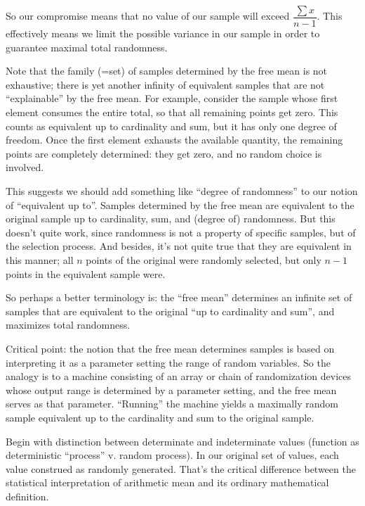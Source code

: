 \begin{ednote}
  So our compromise means that no value of our sample will exceed
  \(\dfrac{\sum x}{n-1}\).  This effectively means we limit the
  possible variance in our sample in order to guarantee maximal
  total randomness.

  Note that the family (=set) of samples determined by the free mean
  is not exhaustive; there is yet another infinity of equivalent
  samples that are not ``explainable'' by the free mean.  For example,
  consider the sample whose first element consumes the entire total,
  so that all remaining points get zero.  This counts as equivalent up
  to cardinality and sum, but it has only one degree of freedom.
  Once the first element exhausts the available quantity, the
  remaining points are completely determined: they get zero, and no
  random choice is involved.

  This suggests we should add something like ``degree of randomness''
  to our notion of ``equivalent up to''.  Samples determined by the
  free mean are equivalent to the original sample up to cardinality,
  sum, and (degree of) randomness.  But this doesn't quite work,
  since randomness is not a property of specific samples, but of the
  selection process.  And besides, it's not quite true that they are
  equivalent in this manner; all \(n\) points of the original were
  randomly selected, but only \(n-1\) points in the equivalent sample
  were.

  So perhaps a better terminology is: the ``free mean'' determines an
  infinite set of samples that are equivalent to the original ``up to
  cardinality and sum'', and maximizes total randomness.

  Critical point: the notion that the free mean determines samples is
  based on interpreting it as a parameter setting the range of random
  variables.  So the analogy is to a machine consisting of an array or
  chain of randomization devices whose output range is determined by a
  parameter setting, and the free mean serves as that parameter.
  ``Running'' the machine yields a maximally random sample equivalent
  up to the cardinality and sum to the original sample.
\end{ednote}

\begin{ednote}
  Begin with distinction between determinate and indeterminate values
  (function as deterministic ``process'' v. random process).  In our
  original set of values, each value construed as randomly generated.
  That's the critical difference between the statistical
  interpretation of arithmetic mean and its ordinary mathematical
  definition.
\end{ednote}

